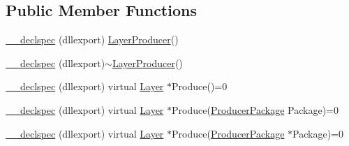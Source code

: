 \subsection*{Public Member Functions}
\begin{DoxyCompactItemize}
\item 
\hyperlink{class_layer_producer_a6228aba68947885df127588e5eb81715}{\-\_\-\-\_\-declspec} (dllexport) \hyperlink{class_layer_producer}{Layer\-Producer}()
\item 
\hyperlink{class_layer_producer_a41661b95185b1bad454ccad7ca191a34}{\-\_\-\-\_\-declspec} (dllexport)$\sim$\hyperlink{class_layer_producer}{Layer\-Producer}()
\item 
\hyperlink{class_layer_producer_a38ac095d29d14c2c6d7684846362648e}{\-\_\-\-\_\-declspec} (dllexport) virtual \hyperlink{class_layer}{Layer} $\ast$Produce()=0
\item 
\hyperlink{class_layer_producer_a17f1180d7c95d164730c6104d305b583}{\-\_\-\-\_\-declspec} (dllexport) virtual \hyperlink{class_layer}{Layer} $\ast$Produce(\hyperlink{class_producer_package}{Producer\-Package} Package)=0
\item 
\hyperlink{class_layer_producer_a5e0f254e3de5e9e34075e4a4dd00dc0a}{\-\_\-\-\_\-declspec} (dllexport) virtual \hyperlink{class_layer}{Layer} $\ast$Produce(\hyperlink{class_producer_package}{Producer\-Package} $\ast$Package)=0
\end{DoxyCompactItemize}


